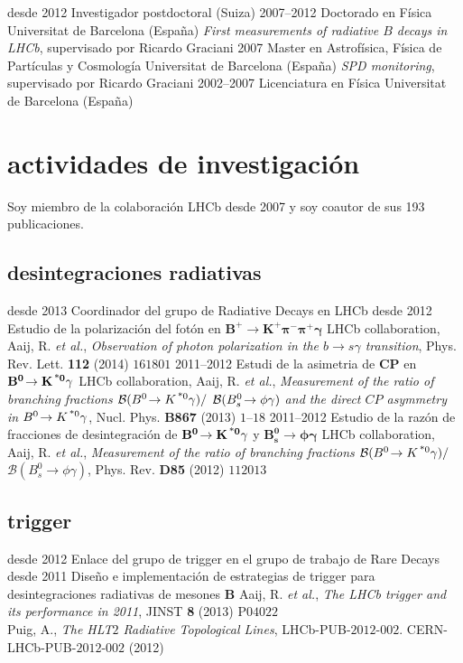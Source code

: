   \cventry
    {desde 2012}
    {Investigador postdoctoral}
    {\epfl(Suiza)}
    {}
  \cventry
    {2007--2012}
    {Doctorado en Física}
    {Universitat de Barcelona (España)}
    {\emph{First measurements of radiative $B$ decays in LHCb}, supervisado por Ricardo Graciani}
  \cventry
    {2007}
    {Master en Astrofísica, Física de Partículas y Cosmología}
    {Universitat de Barcelona (España)}
    {\emph{SPD monitoring}, supervisado por  Ricardo Graciani}
  \cventry
    {2002--2007}
    {Licenciatura en Física}
    {Universitat de Barcelona (España)}
    {}

\section{actividades de investigación}
Soy miembro de la colaboración LHCb desde 2007 y soy coautor de sus 193 publicaciones.


\subsection{desintegraciones radiativas}
    \cventry
    {desde 2013}
    {Coordinador del grupo de Radiative Decays en LHCb}
    {}
    {}
    \cventry
    {desde 2012}
    {Estudio de la polarización del fotón en $\mathbf{B^+\!\to K^+\pi^-\pi^+\gamma}$}
    {}
    {LHCb collaboration, Aaij, R. \textit{et al.}, \textit{Observation of photon polarization in the $b \to s\gamma$ transition}, Phys. Rev. Lett. \textbf{112} (2014) $161801$}
    \cventry
    {2011--2012}
    {Estudi de la asimetria de $\mathbf{CP}$ en $\mathbf{B^0\!\to K^{\text{\,*}0}\gamma}$}
    {}
    {LHCb collaboration, Aaij, R. \textit{et al.}, \textit{Measurement of the ratio of branching fractions ${\cal B}(B^0\!\to K^{\text{\,*}0} \gamma) /$ ${\cal B}(B^0_s\!\to \phi \gamma)$ and the direct $CP$ asymmetry in $B^0\!\to K^{\text{\,*}0} \gamma$}, Nucl. Phys. \textbf{B867} (2013) $1$--$18$}
    \cventry
    {2011--2012}
    {Estudio de la razón de fracciones de desintegración de $\mathbf{B^0\!\to K^{\text{\,*}0}\gamma}$ y $\mathbf{B^0_s\!\to \phi\gamma}$}
    {}
    {LHCb collaboration, Aaij, R. \textit{et al.}, \textit{Measurement of the ratio of branching fractions $\mathcal{B}(B^0\!\to K^{\text{\,*}0}\gamma)/$ $\mathcal{B}(B_s^0\to\phi\gamma)$}, Phys. Rev. \textbf{D85} (2012) $112013$}

\subsection{trigger}
    \cventry
    {desde 2012}
    {Enlace del grupo de trigger en el grupo de trabajo de Rare Decays}
    {}
    {}
    \cventry
    {desde 2011}
    {Diseño e implementación de estrategias de trigger para desintegraciones radiativas de mesones $\mathbf{B}$}
    {}
    {Aaij, R. \textit{et al.}, \textit{The LHCb trigger and its performance in 2011}, JINST \textbf{8} (2013) P$04022$\\
     Puig, A., \textit{The HLT$2$ Radiative Topological Lines}, LHCb-PUB-$2012$-$002$. CERN-LHCb-PUB-$2012$-$002$ (2012)}

